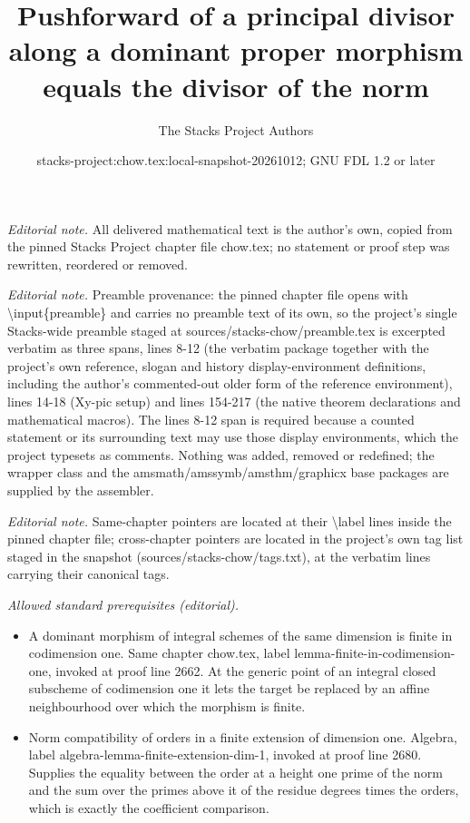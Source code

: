 \documentclass[10pt,a4paper]{amsart}
\title{Pushforward of a principal divisor along a dominant proper morphism equals the divisor of the norm}
\author{The Stacks Project Authors}
\date{stacks-project:chow.tex:local-snapshot-20261012; GNU FDL 1.2 or later}
\theoremstyle{plain}
\theoremstyle{definition}
\theoremstyle{remark}
\numberwithin{equation}{subsection}
\begin{document}
\maketitle
\noindent\textit{Editorial note.} All delivered mathematical text is the author's own, copied from the pinned Stacks Project chapter file chow.tex; no statement or proof step was rewritten, reordered or removed.\par\medskip
\noindent\textit{Editorial note.} Preamble provenance: the pinned chapter file opens with \textbackslash{}input\{preamble\} and carries no preamble text of its own, so the project's single Stacks-wide preamble staged at sources/stacks-chow/preamble.tex is excerpted verbatim as three spans, lines 8-12 (the verbatim package together with the project's own reference, slogan and history display-environment definitions, including the author's commented-out older form of the reference environment), lines 14-18 (Xy-pic setup) and lines 154-217 (the native theorem declarations and mathematical macros). The lines 8-12 span is required because a counted statement or its surrounding text may use those display environments, which the project typesets as comments. Nothing was added, removed or redefined; the wrapper class and the amsmath/amssymb/amsthm/graphicx base packages are supplied by the assembler.\par\medskip
\noindent\textit{Editorial note.} Same-chapter pointers are located at their \textbackslash{}label lines inside the pinned chapter file; cross-chapter pointers are located in the project's own tag list staged in the snapshot (sources/stacks-chow/tags.txt), at the verbatim lines carrying their canonical tags.\par\medskip
\noindent\textit{Allowed standard prerequisites (editorial).}\begin{itemize}
\item A dominant morphism of integral schemes of the same dimension is finite in codimension one. Same chapter chow.tex, label lemma-finite-in-codimension-one, invoked at proof line 2662. At the generic point of an integral closed subscheme of codimension one it lets the target be replaced by an affine neighbourhood over which the morphism is finite.
\item Norm compatibility of orders in a finite extension of dimension one. Algebra, label algebra-lemma-finite-extension-dim-1, invoked at proof line 2680. Supplies the equality between the order at a height one prime of the norm and the sum over the primes above it of the residue degrees times the orders, which is exactly the coefficient comparison.
\end{itemize}\medskip
\end{document}
